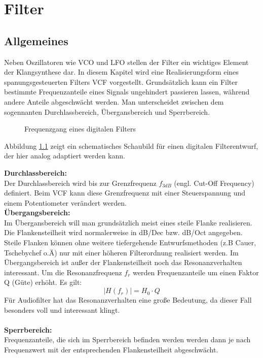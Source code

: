 \chapter{Filter}
\label{ch:concept}
\section{Allgemeines}
Neben Oszillatoren wie VCO und LFO stellen der Filter ein wichtiges Element der Klangsynthese dar.
In diesem Kapitel wird eine Realisierungsform eines spanungsgesteuerten Filters VCF vorgestellt. 
Grundsätzlich kann ein Filter bestimmte Frequenzanteile eines Signals ungehindert passieren lassen, während andere Anteile
abgeschwächt werden.
Man unterscheidet zwischen dem sogennanten Durchlassbereich, Übergansbereich und Sperrbereich.

\begin{figure}[h]
	\centering
	\setlength{\fboxsep}{1pt} %
	\setlength{\fboxrule}{1pt} %
	\caption{Frequenzgang eines digitalen Filters}
	\label{fig:toleranzschema}
\end{figure}
Abbildung \ref{fig:toleranzschema} zeigt ein schematisches Schaubild für einen digitalen Filterentwurf, der hier analog adaptiert werden kann.

\textbf{Durchlassbereich:}\\
Der Durchlassbereich wird bis zur Grenzfrequenz $f_{3dB}$ (engl. Cut-Off Frequency) definiert.
Beim VCF kann diese Grenzfrequenz mit einer Steuerspannung und einem Potentiometer verändert werden. \\

\textbf{Übergangsbereich:}\\
Im Übergansbereich will man grundsätzlich meist eines steile Flanke realisieren. Die Flankensteilheit wird normalerweise in dB/Dec bzw. dB/Oct angegeben.
Steile Flanken können ohne weitere tiefergehende Entwurfsmethoden (z.B Cauer, Tschebychef o.Ä) nur mit einer höheren Filterordnung realisiert werden.
Im Übergangsbereich ist außer der Flankensteilheit noch das Resonanzverhalten interessant. Um die Resonanzfrequenz $f_r$ werden Frequenzanteile um einen Faktor Q (Güte) erhöht.  
Es gilt: 
\begin{equation}  \label{eq:1}
  |H(f_r)| = H_0 \cdot Q
\end{equation}
Für Audiofilter hat das Resonanzverhalten eine große Bedeutung, da dieser Fall besonders voll und interessant klingt.\\
\\
\textbf{Sperrbereich:}\\
Frequenzanteile, die sich im Sperrbereich befinden werden werden dann je nach Frequenzwert mit der entsprechenden Flankensteilheit abgeschwächt.



